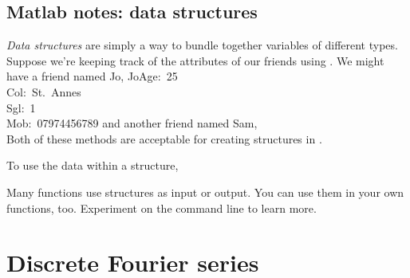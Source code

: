 \documentclass[12pt,twoside,a4paper]{article}
\begin{document}
\subsection*{Matlab notes: data structures}

\textit{Data structures} are simply a way to bundle together variables
of different types.  Suppose we're keeping track of the attributes of
our friends using \Mlab.  We might have a friend named Jo,
{Jo}{Age:~25\\Col:~\qu{}St.~Annes\qu{}\\Sgl:~1\\Mob:~\qu{}07974456789\qu{}}
and another friend named Sam,   
\\
Both of these methods are acceptable for creating structures in \Mlab.

To use the data within a structure, 

Many \Mlab functions use structures as input or output. You can use
them in your own functions, too. Experiment on the command line to
learn more.

\section{Discrete Fourier series}
\end{document}
